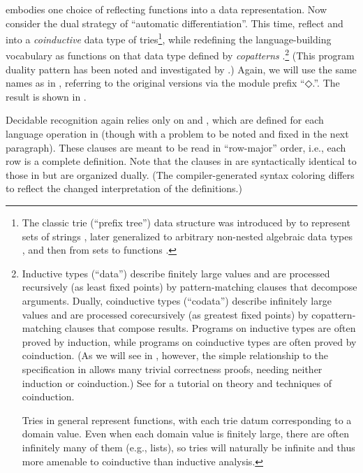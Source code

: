 \documentclass[acmsmall,screen,timestamp]{acmart}  %
\begin{document}
\rnc{}

 embodies one choice of reflecting functions into a data representation.
Now consider the dual strategy of ``automatic differentiation''.
This time, reflect  and  into a \emph{coinductive} data type of tries\footnote{The classic trie (``prefix tree'') data structure was introduced by \citet{Thue1912Gegenseitige} to represent sets of strings \citep[Section 6.3]{Knuth1998ACP3}, later generalized to arbitrary non-nested algebraic data types \citep{Connelly1995GenTrie}, and then from sets to functions \citep{Hinze2000GGT}.}, while redefining the language-building vocabulary as functions on that data type defined by \emph{copatterns} \citep{AbelPientka2016}.\footnote{Inductive types (``data'') describe finitely large values and are processed recursively (as least fixed points) by pattern-matching clauses that decompose arguments.
Dually, coinductive types (``codata'') describe infinitely large values and are processed corecursively (as greatest fixed points) by copattern-matching clauses that compose results.
Programs on inductive types are often proved by induction, while programs on coinductive types are often proved by coinduction.
(As we will see in , however, the simple relationship to the specification in  allows many trivial correctness proofs, needing neither induction or coinduction.)
See \citet{Gordon1995:coinduction} for a tutorial on theory and techniques of coinduction.

Tries in general represent functions, with each trie datum corresponding to a domain value.
Even when each domain value is finitely large, there are often infinitely many of them (e.g., lists), so tries will naturally be infinite and thus more amenable to coinductive than inductive analysis.}
(This program duality pattern has been noted and investigated by \citet{OstermannJabs2018}.)
Again, we will use the same names as in , referring to the original versions via the module prefix ``{◇.}\hspace{0.05em}''.
The result is shown in .

Decidable recognition again relies only on  and , which are defined for each language operation in  (though with a problem to be noted and fixed in the next paragraph).
These clauses are meant to be read in ``row-major'' order, i.e., each row is a complete definition.
Note that the clauses in  are syntactically identical to those in  but are organized dually.
(The compiler-generated syntax coloring differs to reflect the changed interpretation of the definitions.)
\end{document}
